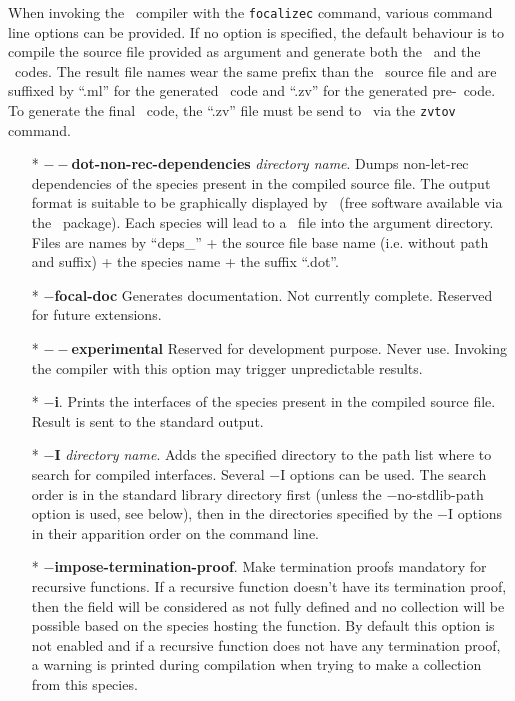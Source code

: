 \label{compiler-options}
When invoking the \focal\ compiler with the {\tt focalizec} command,
various command line options can be provided. If no option is
specified, the default behaviour is to compile the source file
provided as argument and generate both the \ocaml\ and the
\coq\ codes. The result file names wear the same prefix than the
\focal\ source file and are suffixed by ``.ml'' for the generated
\ocaml\ code and ``.zv'' for the generated pre-\coq\ code.
To generate the final \coq\ code, the ``.zv'' file must be send to
\zenon\ via the {\tt zvtov} command.

\begin{itemize}
  \item[*] {\bf $--$dot-non-rec-dependencies} {\em directory name}.
    Dumps non-let-rec dependencies of the species present in the
    compiled source file. The output format is suitable to be
    graphically displayed by \dotty\ (free software available via the
    \graphviz\ package). Each species will lead to a \dotty\ file into
    the argument directory. Files are names by ``deps\_'' + the source
    file base name (i.e. without path and suffix) + the species name +
    the suffix ``.dot''.

  \item[*] {\bf $-$focal-doc} Generates documentation. Not currently
    complete. Reserved for future extensions.

  \item[*] {\bf $--$experimental} Reserved for development purpose.
    Never use. Invoking the compiler with this option may trigger
    unpredictable results.

  \item[*] {\bf $-$i}. Prints the interfaces of the species present in
    the compiled source file. Result is sent to the standard output.

  \item[*] {\bf $-$I} {\em directory name}. Adds the specified
    directory to the path list where to search for compiled
    interfaces. Several $-$I options can be used. The search order is
    in the standard library directory first (unless the
    $-$no-stdlib-path option is used, see below), then in the
    directories specified by the $-$I options in their apparition
    order on the command line.

  \item[*] {\bf $-$impose-termination-proof}. Make termination proofs
    mandatory for recursive functions. If a recursive function doesn't
    have its termination proof, then the field will be considered as
    not fully defined and no collection will be possible based on the
    species hosting the function. By default this option is not
    enabled and if a recursive function does not have any termination
    proof, a warning is printed during compilation when trying to make
    a collection from this species.


\end{itemize}
